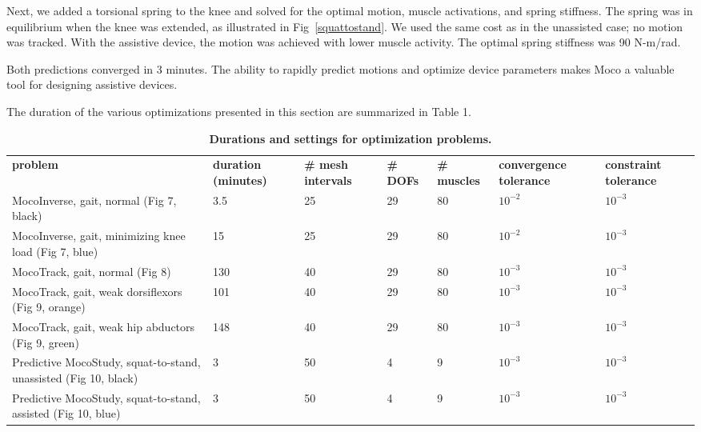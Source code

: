 \documentclass[10pt,letterpaper]{article}
\newlength\savedwidth
\newcommand\thickhline{\noalign{\global\savedwidth\arrayrulewidth\global\arrayrulewidth 2pt}%
\hline
\noalign{\global\arrayrulewidth\savedwidth}}
\begin{document}
Next, we added a torsional spring to the knee and solved for the optimal motion, muscle activations, and spring stiffness. The spring was in equilibrium when the knee was extended, as illustrated in Fig~\ref{squattostand}. We used the same cost as in the unassisted case; no motion was tracked. With the assistive device, the motion was achieved with lower muscle activity. The optimal spring stiffness was 90 N-m/rad.

Both predictions converged in 3 minutes. The ability to rapidly predict motions and optimize device parameters makes Moco a valuable tool for designing assistive devices.

The duration of the various optimizations presented in this section are summarized in Table 1.

\begin{table}[!ht]
    \begin{adjustwidth}{-2.25in}{0in} %
        \centering
        \caption{
            {\bf Durations and settings for optimization problems.}}
        \begin{tabular}{|P{12em}|p{5em}|p{5em}|l|l|p{6em}|p{5em}|}
            \hline
            {\bf problem} & {\bf duration (minutes)} & {\bf \# mesh intervals} & {\bf \# DOFs} & {\bf \# muscles} & {\bf convergence tolerance} & {\bf constraint tolerance} \\ \thickhline
            MocoInverse, gait, normal (Fig 7, black) & 3.5 & 25 & 29 & 80 & $10^{-2}$ & $10^{-3}$ \\ \hline
            MocoInverse, gait, minimizing knee load (Fig 7, blue) & 15 & 25 & 29 & 80 & $10^{-2}$ & $10^{-3}$ \\ \hline
            MocoTrack, gait, normal (Fig 8) & 130 & 40 & 29 & 80 & $10^{-3}$ & $10^{-3}$ \\ \hline
            MocoTrack, gait, weak dorsiflexors (Fig 9, orange) & 101 & 40 & 29 & 80 & $10^{-3}$ & $10^{-3}$ \\ \hline
            MocoTrack, gait, weak hip abductors (Fig 9, green) & 148 & 40 & 29 & 80 & $10^{-3}$ & $10^{-3}$ \\ \hline
            Predictive MocoStudy, squat-to-stand, unassisted (Fig 10, black) & 3 & 50 & 4 & 9 & $10^{-3}$ & $10^{-3}$ \\ \hline
            Predictive MocoStudy, squat-to-stand, assisted (Fig 10, blue) & 3 & 50 & 4 & 9 & $10^{-3}$ & $10^{-3}$ \\ \hline
        \end{tabular}

\end{adjustwidth}
\end{table}
\end{document}
